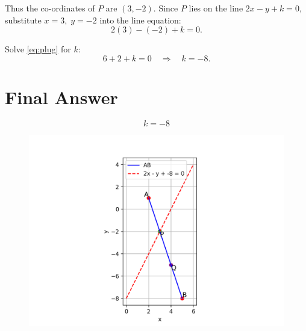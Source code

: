 \documentclass[12pt]{article}
\begin{document}
Thus the co-ordinates of \(P\) are \( (3, -2)\). Since \(P\) lies on the line \(2x - y + k = 0\), substitute \(x=3,\; y=-2\) into the line equation:
\begin{equation}
2(3) - (-2) + k = 0.
\label{eq:plug}
\end{equation}

Solve \eqref{eq:plug} for \(k\):
\begin{equation}
6 + 2 + k = 0 \quad\Longrightarrow\quad k = -8.
\label{eq:kval}
\end{equation}

\section*{Final Answer}
\begin{equation}
\boxed{k = -8}
\end{equation}
 \begin{figure}[h!]
    \centering
    \includegraphics[width=0.65\linewidth]{figs/fig.png}
    \caption{}
\end{figure}
\end{document}
